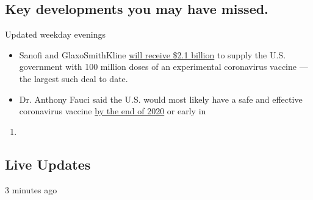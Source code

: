 \hypertarget{key-developments-you-may-have-missed}{%
\subsection{Key developments you may have
missed.}\label{key-developments-you-may-have-missed}}

Updated weekday evenings

\begin{itemize}
\tightlist
\item
  Sanofi and GlaxoSmithKline
  \href{https://www.nytimes.com/2020/07/31/health/covid-19-vaccine-sanofi-gsk.html}{will
  receive \$2.1 billion} to supply the U.S. government with 100 million
  doses of an experimental coronavirus vaccine --- the largest such deal
  to date.
\item
  Dr. Anthony Fauci said the U.S. would most likely have a safe and
  effective coronavirus vaccine
  \href{https://www.nytimes.com/aponline/2020/07/31/us/politics/ap-us-virus-outbreak-fauci.html}{by
  the end of 2020} or early in
\end{itemize}

\begin{enumerate}
\def\labelenumi{\arabic{enumi}.}
\setcounter{enumi}{2020}
\item
\end{enumerate}

\hypertarget{live-updates}{%
\subsection{Live Updates}\label{live-updates}}

3 minutes ago


